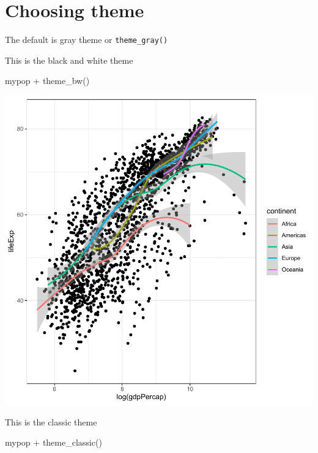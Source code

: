 \documentclass[
]{book}
\makeatletter
\newenvironment{Shaded}{\begin{snugshade}}{\end{snugshade}}
\newcommand{\FunctionTok}[1]{\textcolor[rgb]{0,0,0}{#1}}
\newcommand{\NormalTok}[1]{#1}
\newcommand{\SpecialCharTok}[1]{\textcolor[rgb]{0,0,0}{#1}}
\newenvironment{kframe}{%
\medskip{}
\setlength{\fboxsep}{.8em}
 \def\at@end@of@kframe{}%
 \ifinner\ifhmode%
  \def\at@end@of@kframe{\end{minipage}}%
  \begin{minipage}{\columnwidth}%
 \fi\fi%
 \def\FrameCommand##1{\hskip\@totalleftmargin \hskip-\fboxsep
 \colorbox{shadecolor}{##1}\hskip-\fboxsep
     \hskip-\linewidth \hskip-\@totalleftmargin \hskip\columnwidth}%
 \MakeFramed {\advance\hsize-\width
   \@totalleftmargin\z@ \linewidth\hsize
   \@setminipage}}%
 {\par\unskip\endMakeFramed%
 \at@end@of@kframe}
\renewenvironment{Shaded}{\begin{kframe}}{\end{kframe}}
\makeatother
\begin{document}
\hypertarget{choosing-theme}{%
\section{Choosing theme}\label{choosing-theme}}

The default is gray theme or \texttt{theme\_gray()}

This is the black and white theme

\begin{Shaded}
\begin{Highlighting}[]
\NormalTok{mypop }\SpecialCharTok{+} \FunctionTok{theme\_bw}\NormalTok{()}
\end{Highlighting}
\end{Shaded}

\begin{center}\includegraphics[width=0.7\linewidth,keepaspectratio]{Multivariable_Data_Analysis_files/figure-latex/unnamed-chunk-41-1} \end{center}

This is the classic theme

\begin{Shaded}
\begin{Highlighting}[]
\NormalTok{mypop }\SpecialCharTok{+} \FunctionTok{theme\_classic}\NormalTok{()}
\end{Highlighting}
\end{Shaded}
\end{document}
